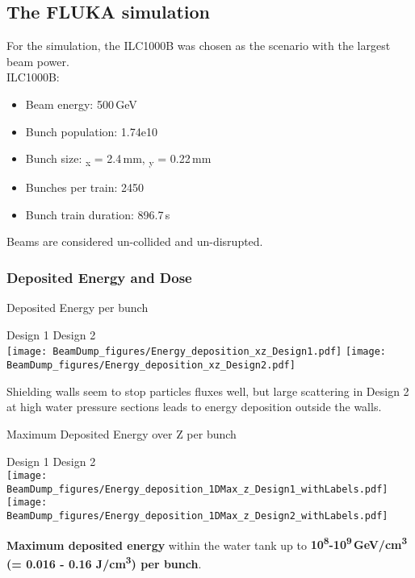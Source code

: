 \documentclass[xcolor={dvipsnames}]{beamer}
\begin{document}
\subsection{The FLUKA simulation}
\begin{frame}
For the simulation, the ILC1000B was chosen as the scenario with the largest beam power.\\
\vspace*{0.5cm}
 ILC1000B:
 \begin{itemize}
  \item Beam energy: 500\,GeV
  \item Bunch population: 1.74e10
  \item Bunch size: \textsigma\textsubscript{x} = 2.4\,mm, \textsigma\textsubscript{y} = 0.22\,mm
  \item Bunches per train: 2450
  \item Bunch train duration: 896.7\,\textmu s
 \end{itemize}
\vspace*{0.2cm}
Beams are considered un-collided and un-disrupted.
\end{frame}


\subsubsection{Deposited Energy and Dose}
\begin{frame}{Deposited Energy per bunch}
\begin{center}
\hspace*{1.6cm} Design 1 \hfill Design 2 \hspace*{1.8cm} \\
  \texttt{[image: BeamDump\_figures/Energy\_deposition\_xz\_Design1.pdf]}
    \texttt{[image: BeamDump\_figures/Energy\_deposition\_xz\_Design2.pdf]}
\end{center}
 Shielding walls seem to stop particles fluxes well, but large scattering in Design 2 at high water pressure sections leads to energy deposition outside the walls.
\end{frame}
\begin{frame}{Maximum Deposited Energy over Z per bunch}
\begin{center}
\hspace*{1.6cm} Design 1 \hfill Design 2 \hspace*{1.8cm} \\
  \texttt{[image: BeamDump\_figures/Energy\_deposition\_1DMax\_z\_Design1\_withLabels.pdf]}
    \texttt{[image: BeamDump\_figures/Energy\_deposition\_1DMax\_z\_Design2\_withLabels.pdf]}
\end{center}
  \textbf{Maximum deposited energy} within the water tank up to \textbf{10\textsuperscript{8}-10\textsuperscript{9}\,GeV/cm\textsuperscript{3} (= 0.016 - 0.16 J/cm\textsuperscript{3}) per bunch}.
\end{frame}
\end{document}

